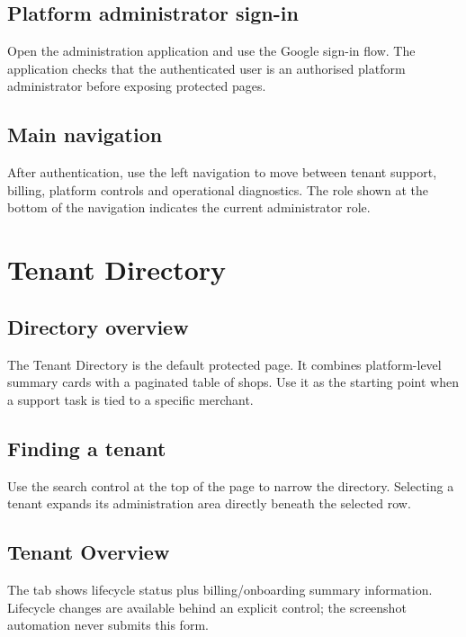\section{Platform administrator sign-in}
Open the administration application and use the Google sign-in flow. The application checks that the authenticated user is an authorised platform administrator before exposing protected pages.


\section{Main navigation}
After authentication, use the left navigation to move between tenant support, billing, platform controls and operational diagnostics. The role shown at the bottom of the navigation indicates the current administrator role.


\chapter{Tenant Directory}

\section{Directory overview}
The Tenant Directory is the default protected page. It combines platform-level summary cards with a paginated table of shops. Use it as the starting point when a support task is tied to a specific merchant.


\section{Finding a tenant}
Use the search control at the top of the page to narrow the directory. Selecting a tenant expands its administration area directly beneath the selected row.


\section{Tenant Overview}
The  tab shows lifecycle status plus billing/onboarding summary information. Lifecycle changes are available behind an explicit control; the screenshot automation never submits this form.

